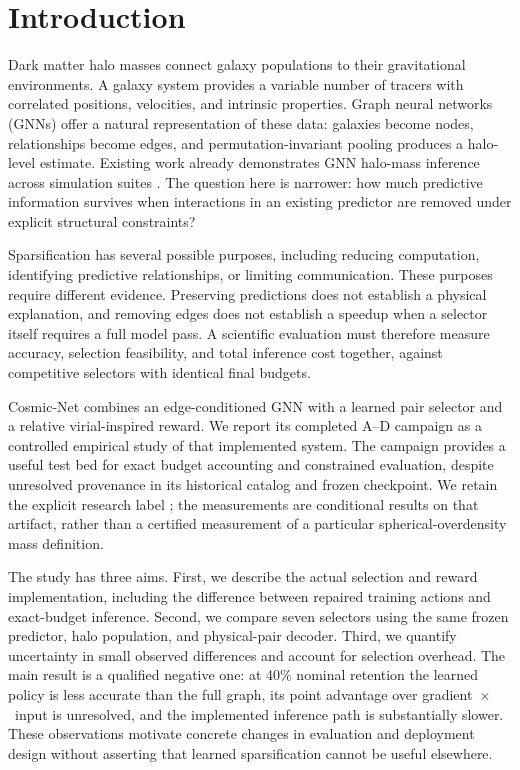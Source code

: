 \section{Introduction}
Dark matter halo masses connect galaxy populations to their gravitational environments. A galaxy system provides a variable number of tracers with correlated positions, velocities, and intrinsic properties. Graph neural networks (GNNs) offer a natural representation of these data: galaxies become nodes, relationships become edges, and permutation-invariant pooling produces a halo-level estimate. Existing work already demonstrates GNN halo-mass inference across simulation suites \citep{villanueva2022,garuda2024}. The question here is narrower: how much predictive information survives when interactions in an existing predictor are removed under explicit structural constraints?

Sparsification has several possible purposes, including reducing computation, identifying predictive relationships, or limiting communication. These purposes require different evidence. Preserving predictions does not establish a physical explanation, and removing edges does not establish a speedup when a selector itself requires a full model pass. A scientific evaluation must therefore measure accuracy, selection feasibility, and total inference cost together, against competitive selectors with identical final budgets.

Cosmic-Net combines an edge-conditioned GNN with a learned pair selector and a relative virial-inspired reward. We report its completed A--D campaign as a controlled empirical study of that implemented system. The campaign provides a useful test bed for exact budget accounting and constrained evaluation, despite unresolved provenance in its historical catalog and frozen checkpoint. We retain the explicit research label ; the measurements are conditional results on that artifact, rather than a certified measurement of a particular spherical-overdensity mass definition.

The study has three aims. First, we describe the actual selection and reward implementation, including the difference between repaired training actions and exact-budget inference. Second, we compare seven selectors using the same frozen predictor, halo population, and physical-pair decoder. Third, we quantify uncertainty in small observed differences and account for selection overhead. The main result is a qualified negative one: at 40\% nominal retention the learned policy is less accurate than the full graph, its point advantage over gradient~$\times$~input is unresolved, and the implemented inference path is substantially slower. These observations motivate concrete changes in evaluation and deployment design without asserting that learned sparsification cannot be useful elsewhere.
